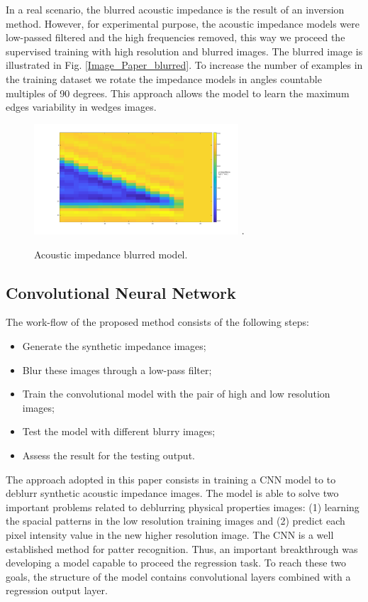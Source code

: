 \documentclass[conference,compsoc]{IEEEtran}
\begin{document}
In a real scenario, the blurred acoustic impedance is the
result of an inversion method. However, for experimental purpose, the acoustic impedance models were low-passed filtered
and the high frequencies removed, this way we proceed the supervised training with high resolution and blurred images. The blurred image
is illustrated in Fig. \ref{Image_Paper_blurred}. To increase the number of examples in the training dataset we rotate the impedance models 
in angles countable multiples of 90 degrees. This approach allows the model to learn the maximum edges variability in wedges images.
\begin{figure}[!t]
\centering
\includegraphics[width=3.0in]{Image_Paper_blurred}
\DeclareGraphicsExtensions.
\caption{Acoustic impedance blurred model.}
\label{fig_blur}
\end{figure}

\subsection{Convolutional Neural Network}
The work-flow of the proposed method consists of the following
steps:
\begin{itemize}
 \item Generate the synthetic impedance images;
 \item Blur these images through a low-pass filter;
 \item Train the convolutional model with the pair of high and low resolution images;
 \item Test the model with different blurry images;
 \item Assess the result for the testing output.
\end{itemize}

The approach adopted in this paper consists in training a CNN model to
to deblurr synthetic acoustic impedance images. The model
is able to solve two important problems related to deblurring physical properties
images: (1) learning the spacial patterns in the low resolution
training images and (2) predict each pixel intensity value in the new
higher resolution image. The CNN is a well established method for
patter recognition. Thus, an important breakthrough was developing a model
capable to proceed the regression task. To reach these two goals, the structure of the
model contains convolutional layers combined with a regression output
layer.
\end{document}
